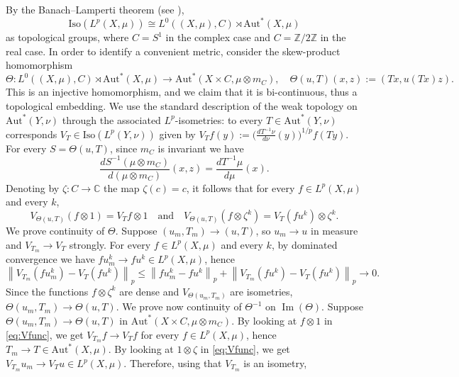 \documentclass{amsart}
\numberwithin{equation}{subsection}
\theoremstyle{plain}
\theoremstyle{definition}
\theoremstyle{plain}
\begin{document}
By the Banach--Lamperti theorem (see \cite[Cor.~6.8]{giordano2007some}),
\begin{equation}\label{eq:BanLam}
\mathrm{Iso}\left(L^{p}\left(X,\mu\right)\right)\cong L^{0}\left(\left(X,\mu\right),C\right)\rtimes\mathrm{Aut}^{\ast}\left(X,\mu\right)
\end{equation}
as topological groups, where \(C=S^{1}\) in the complex case and \(C=\mathbb{Z}/2\mathbb{Z}\) in the real case. In order to identify a convenient metric, consider the skew-product homomorphism
\[\Theta:L^{0}\left(\left(X,\mu\right),C\right)\rtimes\mathrm{Aut}^{\ast}\left(X,\mu\right)\to\mathrm{Aut}^{\ast}\left(X\times C,\mu\otimes m_{C}\right),\quad\Theta\left(u,T\right)\left(x,z\right):=\left(Tx,u\left(Tx\right)z\right).\]
This is an injective homomorphism, and we claim that it is bi-continuous, thus a topological embedding. We use the standard description of the weak topology on \(\mathrm{Aut}^{\ast}\left(Y,\nu\right)\) through the associated \(L^{p}\)-isometries: to every  \(T\in\mathrm{Aut}^{\ast}\left(Y,\nu\right)\) corresponds \(V_{T}\in\mathrm{Iso}\left(L^{p}\left(Y,\nu\right)\right)\) given by \(V_{T}f\left(y\right):=\big(\frac{dT^{-1}\nu}{d\nu}\left(y\right)\big)^{1/p}f\left(Ty\right)\). For every \(S=\Theta\left(u,T\right)\), since \(m_{C}\) is invariant we have
\[\frac{dS^{-1}\left(\mu\otimes m_{C}\right)}{d\left(\mu\otimes m_{C}\right)}\left(x,z\right)=\frac{dT^{-1}\mu}{d\mu}\left(x\right).\]
Denoting by \(\zeta:C\to\mathbb{C}\) the map \(\zeta\left(c\right)=c\), it follows that for every \(f\in L^{p}\left(X,\mu\right)\) and every \(k\),
\begin{equation}\label{eq:Vfunc}
V_{\Theta\left(u,T\right)}\left(f\otimes1\right)=V_{T}f\otimes1\quad\text{and}\quad V_{\Theta\left(u,T\right)}\left(f\otimes\zeta^{k}\right)=V_{T}\left(fu^{k}\right)\otimes\zeta^{k}.
\end{equation}
We prove continuity of \(\Theta\). Suppose \(\left(u_{m},T_{m}\right)\to\left(u,T\right)\), so \(u_{m}\to u\) in measure and \(V_{T_{m}}\to V_{T}\) strongly. For every \(f\in L^{p}\left(X,\mu\right)\) and every \(k\), by dominated convergence we have \(fu_{m}^{k}\to fu^{k}\in L^{p}\left(X,\mu\right)\), hence
\[\left\|V_{T_{m}}\left(fu_{m}^{k}\right)-V_{T}\left(fu^{k}\right)\right\|_{p}\leq\left\|fu_{m}^{k}-fu^{k}\right\|_{p}+\left\|V_{T_{m}}\left(fu^{k}\right)-V_{T}\left(fu^{k}\right)\right\|_{p}\to0.\]
Since the functions \(f\otimes\zeta^{k}\) are dense and \(V_{\Theta\left(u_{m},T_{m}\right)}\) are isometries, \(\Theta\left(u_{m},T_{m}\right)\to\Theta\left(u,T\right)\). We prove now continuity of \(\Theta^{-1}\) on \(\operatorname{Im}\left(\Theta\right)\). Suppose \(\Theta\left(u_{m},T_{m}\right)\to\Theta\left(u,T\right)\) in \(\mathrm{Aut}^{\ast}\left(X\times C,\mu\otimes m_{C}\right)\). By looking at \(f\otimes1\) in \eqref{eq:Vfunc}, we get \(V_{T_{m}}f\to V_{T}f\) for every \(f\in L^{p}\left(X,\mu\right)\), hence \(T_{m}\to T\in\mathrm{Aut}^{\ast}\left(X,\mu\right)\). By looking at \(1\otimes\zeta\) in \eqref{eq:Vfunc}, we get \(V_{T_{m}}u_{m}\to V_{T}u\in L^{p}\left(X,\mu\right)\). Therefore, using that \(V_{T_{m}}\) is an isometry,
\end{document}
